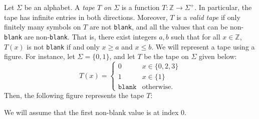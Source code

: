 Let $\Sigma$ be an alphabet. A \emph{tape $T$ on $\Sigma$} is a function $T\colon \mathbb{Z} \to \Sigma^+$. In particular, the tape has infinite entries in both directions. Moreover, $T$ is a \emph{valid tape} if only finitely many symbols on $T$ are not \texttt{blank}, and all the values that can be non-\texttt{blank} are non-\texttt{blank}. That is, there exist integers $a, b$ such that for all $x \in \mathbb{Z}$, $T(x)$ is not \texttt{blank} if and only $x \geq a$ and $x \leq b$. We will represent a tape using a figure. For instance, let $\Sigma = \{0, 1\}$, and let $T$ be the tape on $\Sigma$ given below:
\[T(x) = \begin{cases}
    0 & x \in \{0, 2, 3\} \\
    1 & x \in \{1\} \\
    \texttt{blank} & \text{otherwise}.
\end{cases}\]
Then, the following figure represents the tape $T$:
\begin{figure}[H]
    \centering
\end{figure}
\noindent We will assume that the first non-blank value is at index 0.



